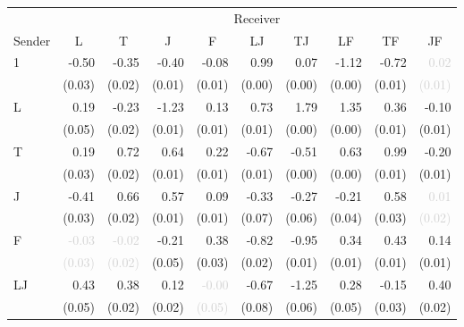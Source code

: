 \begin{tabular}{lrrrrrrrrr}
\toprule
& \multicolumn{9}{c}{Receiver} \\
\cmidrule(l){2-10} 
Sender & \multicolumn{1}{c}{L} & \multicolumn{1}{c}{T} & \multicolumn{1}{c}{J} & \multicolumn{1}{c}{F} & \multicolumn{1}{c}{LJ} & \multicolumn{1}{c}{TJ} & \multicolumn{1}{c}{LF} & \multicolumn{1}{c}{TF} & \multicolumn{1}{c}{JF} \\
\midrule
\multirow{2}{*}{1} &-0.50 &-0.35 &-0.40 &-0.08 &0.99 &0.07 &-1.12 &-0.72 &\textcolor{LightGray}{0.02}\\
 &\tiny{(0.03)} &\tiny{(0.02)} &\tiny{(0.01)} &\tiny{(0.01)} &\tiny{(0.00)} &\tiny{(0.00)} &\tiny{(0.00)} &\tiny{(0.01)} &\textcolor{LightGray}{\tiny{(0.01)}}\\[1ex]
\multirow{2}{*}{L} &\cellcolor{Gray}0.19 &-0.23 &-1.23 &0.13 &0.73 &1.79 &1.35 &0.36 &-0.10\\
 &\cellcolor{Gray}\tiny{(0.05)} &\tiny{(0.02)} &\tiny{(0.01)} &\tiny{(0.01)} &\tiny{(0.01)} &\tiny{(0.00)} &\tiny{(0.00)} &\tiny{(0.01)} &\tiny{(0.01)}\\[1ex]
\multirow{2}{*}{T} &0.19 &\cellcolor{Gray}0.72 &0.64 &0.22 &-0.67 &-0.51 &0.63 &0.99 &-0.20\\
 &\tiny{(0.03)} &\cellcolor{Gray}\tiny{(0.02)} &\tiny{(0.01)} &\tiny{(0.01)} &\tiny{(0.01)} &\tiny{(0.00)} &\tiny{(0.00)} &\tiny{(0.01)} &\tiny{(0.01)}\\[1ex]
\multirow{2}{*}{J} &-0.41 &0.66 &\cellcolor{Gray}0.57 &0.09 &-0.33 &-0.27 &-0.21 &0.58 &\textcolor{LightGray}{0.01}\\
 &\tiny{(0.03)} &\tiny{(0.02)} &\cellcolor{Gray}\tiny{(0.01)} &\tiny{(0.01)} &\tiny{(0.07)} &\tiny{(0.06)} &\tiny{(0.04)} &\tiny{(0.03)} &\textcolor{LightGray}{\tiny{(0.02)}}\\[1ex]
\multirow{2}{*}{F} &\textcolor{LightGray}{-0.03} &\textcolor{LightGray}{-0.02} &-0.21 &\cellcolor{Gray}0.38 &-0.82 &-0.95 &0.34 &0.43 &0.14\\
 &\textcolor{LightGray}{\tiny{(0.03)}} &\textcolor{LightGray}{\tiny{(0.02)}} &\tiny{(0.05)} &\cellcolor{Gray}\tiny{(0.03)} &\tiny{(0.02)} &\tiny{(0.01)} &\tiny{(0.01)} &\tiny{(0.01)} &\tiny{(0.01)}\\[1ex]
\multirow{2}{*}{LJ} &0.43 &0.38 &0.12 &\textcolor{LightGray}{-0.00} &\cellcolor{Gray}-0.67 &-1.25 &0.28 &-0.15 &0.40\\
 &\tiny{(0.05)} &\tiny{(0.02)} &\tiny{(0.02)} &\textcolor{LightGray}{\tiny{(0.05)}} &\cellcolor{Gray}\tiny{(0.08)} &\tiny{(0.06)} &\tiny{(0.05)} &\tiny{(0.03)} &\tiny{(0.02)}\\[1ex]

\end{tabular}
